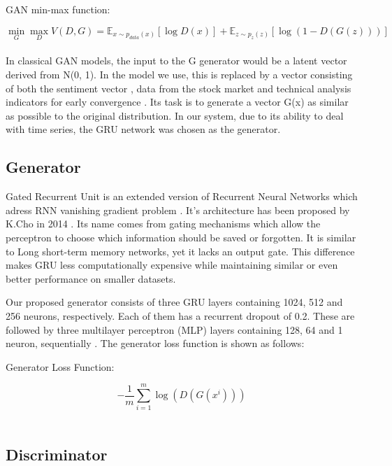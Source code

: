 \documentclass[11pt]{article} %
\begin{document}
\begin{center}   GAN min-max function: \end{center}
\begin{equation} \min_G \max_D V(D, G)=
\mathbb{E}_{x\sim p_{data}(x)}[\log D(x)]
+ \mathbb{E}_{z\sim p_z(z)}[\log(1 - D(G(z)))] \end{equation}\\

In classical GAN models, the input to the G generator would be a latent vector derived from N(0, 1). In the model we use, this is replaced by a vector consisting of both the sentiment vector \cite{gan-stock}, data from the stock market and technical analysis indicators for early convergence \cite{gan-stock2}. Its task is to generate a vector G(x) as similar as possible to the original distribution. In our system, due to its ability to deal with time series, the GRU network was chosen as the generator. 


\subsection{Generator}

Gated Recurrent Unit is an extended version of Recurrent Neural Networks which adress RNN vanishing gradient problem \cite{gru2}.
It's architecture has been proposed by K.Cho in 2014 \cite{gru3}. Its name comes from gating mechanisms which allow the perceptron to choose which information should be saved or forgotten. It is similar to  Long short-term memory networks, yet it lacks an output gate. This difference makes GRU less computationally expensive while maintaining similar or even better performance on smaller datasets. 

Our proposed generator consists of three GRU layers containing 1024, 512 and 256 neurons, respectively. Each of them has a recurrent dropout of 0.2. These are followed by three multilayer perceptron (MLP) layers containing 128, 64 and 1 neuron, sequentially \cite{gan-stock}\cite{gan-stock2}. 
The generator loss function is shown as follows: 

\begin{center}   Generator Loss Function:  \end{center}
\begin{equation}
-\frac{1}{m} \sum_{i=1}^{m} \log \left(D\left(G\left(x^{i}\right)\right)\right)
\end{equation}\\

\subsection{Discriminator}
\end{document}
